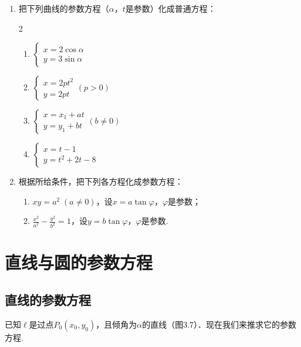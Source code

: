 \begin{enumerate}
\item 把下列曲线的参数方程（$\alpha$，$t$是参数）化成普通方程：
\begin{multicols}{2}
\begin{enumerate}[(1)]
    \item $\begin{cases}
        x=2\cos\alpha\\
        y=3\sin\alpha
    \end{cases}$
    \item $\begin{cases}
        x=2pt^2\\
        y=2pt
    \end{cases}(p>0)$
    \item $\begin{cases}
        x=x_1+at\\
        y=y_1+bt
    \end{cases}(b\ne 0)$
    \item $\begin{cases}
        x=t-1\\
        y=t^2+2t-8
    \end{cases}$
\end{enumerate}
\end{multicols}
\item 根据所给条件，把下列各方程化成参数方程：
\begin{enumerate}[(1)]
    \item $xy=a^2\; (a\ne 0)$，设$x=a\tan\varphi$，$\varphi$是参数；
    \item $\frac{x^2}{a^2}-\frac{y^2}{b^2}=1$，设$y=b\tan\varphi$，$\varphi$是参数.
\end{enumerate}
\end{enumerate}

\section{直线与圆的参数方程}
\subsection{直线的参数方程}
已知$\ell$是过点$P_0(x_0,y_0)$，且倾角为$\alpha$的直线（图3.7）．现在我们来推求它的参数方程.

